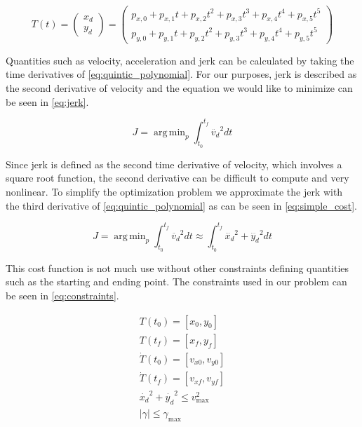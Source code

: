 \documentclass{article}
\DeclareMathOperator*{\argmin}{arg\,min}
\begin{document}
\begin{equation}
  T(t) =\begin{pmatrix}
x_d\\y_d 

\end{pmatrix} = \begin{pmatrix}
p_{x,0} + p_{x,1}t + p_{x,2}t^2 + p_{x,3}t^3 + p_{x,4}t^4 + p_{x,5}t^5\\

p_{y,0} + p_{y,1}t + p_{y,2}t^2 + p_{y,3}t^3 + p_{y,4}t^4 + p_{y,5}t^5 

\end{pmatrix}
\label{eq:quintic_polynomial}
\end{equation}

Quantities such as velocity, acceleration and jerk can be calculated by taking the time 
derivatives of \cref{eq:quintic_polynomial}. For our purposes, jerk is described as the
second derivative of velocity and the equation we would like to minimize can be seen in 
\cref{eq:jerk}.

\begin{equation}
  J = \argmin_p \int_{t_0}^{t_f} \ddot{v_d}^2dt
  \label{eq:jerk}
\end{equation}

Since jerk is defined as the second time derivative of velocity, which involves a square root 
function, the second derivative can be difficult to compute and very nonlinear. To simplify the 
optimization problem we approximate the jerk with the third derivative of \cref{eq:quintic_polynomial}
as can be seen in \cref{eq:simple_cost}.

\begin{equation}
  J = \argmin_p \int_{t_0}^{t_f} \ddot{v_d}^2dt \approx
  \int_{t_0}^{t_f} \dddot{x_d}^2 + \dddot{y_d}^2 dt 
  \label{eq:simple_cost}
\end{equation}

This cost function is not much use without other constraints defining quantities such as
the starting and ending point. The constraints used in our problem can be seen in \cref{eq:constraints}.

\begin{equation}
  \begin{aligned}
    T(t_0) = [x_0, y_0] \\
    T(t_f) = [x_f, y_f] \\
    \dot{T}(t_0) = [v_{x0}, v_{y0}] \\
    \dot{T}(t_f) = [v_{xf}, v_{yf}] \\
    \dot{x_d}^2 + \dot{y_d}^2 \leq v_{\max}^2 \\
    \left |\gamma \right | \leq \gamma_{\max}
  \end{aligned}
  \label{eq:constraints}
\end{equation}
\end{document}
